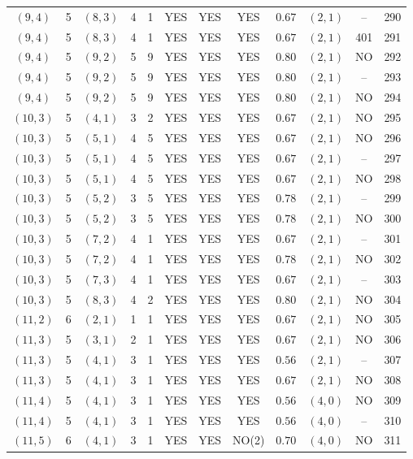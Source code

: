 \begin{longtable}{|c|c|c|c|c|c|c|c|c|c|c|c|}
$(9,4)$ & 5 & $(8,3)$ & 4 & 1 & YES & YES & YES & $0.67$ & $(2,1)$ & -- & 290\\
$(9,4)$ & 5 & $(8,3)$ & 4 & 1 & YES & YES & YES & $0.67$ & $(2,1)$ & 401 & 291\\
$(9,4)$ & 5 & $(9,2)$ & 5 & 9 & YES & YES & YES & $0.80$ & $(2,1)$ & NO & 292\\
$(9,4)$ & 5 & $(9,2)$ & 5 & 9 & YES & YES & YES & $0.80$ & $(2,1)$ & -- & 293\\
$(9,4)$ & 5 & $(9,2)$ & 5 & 9 & YES & YES & YES & $0.80$ & $(2,1)$ & NO & 294\\
$(10,3)$ & 5 & $(4,1)$ & 3 & 2 & YES & YES & YES & $0.67$ & $(2,1)$ & NO & 295\\
$(10,3)$ & 5 & $(5,1)$ & 4 & 5 & YES & YES & YES & $0.67$ & $(2,1)$ & NO & 296\\
$(10,3)$ & 5 & $(5,1)$ & 4 & 5 & YES & YES & YES & $0.67$ & $(2,1)$ & -- & 297\\
$(10,3)$ & 5 & $(5,1)$ & 4 & 5 & YES & YES & YES & $0.67$ & $(2,1)$ & NO & 298\\
$(10,3)$ & 5 & $(5,2)$ & 3 & 5 & YES & YES & YES & $0.78$ & $(2,1)$ & -- & 299\\
$(10,3)$ & 5 & $(5,2)$ & 3 & 5 & YES & YES & YES & $0.78$ & $(2,1)$ & NO & 300\\
$(10,3)$ & 5 & $(7,2)$ & 4 & 1 & YES & YES & YES & $0.67$ & $(2,1)$ & -- & 301\\
$(10,3)$ & 5 & $(7,2)$ & 4 & 1 & YES & YES & YES & $0.78$ & $(2,1)$ & NO & 302\\
$(10,3)$ & 5 & $(7,3)$ & 4 & 1 & YES & YES & YES & $0.67$ & $(2,1)$ & -- & 303\\
$(10,3)$ & 5 & $(8,3)$ & 4 & 2 & YES & YES & YES & $0.80$ & $(2,1)$ & NO & 304\\
$(11,2)$ & 6 & $(2,1)$ & 1 & 1 & YES & YES & YES & $0.67$ & $(2,1)$ & NO & 305\\
$(11,3)$ & 5 & $(3,1)$ & 2 & 1 & YES & YES & YES & $0.67$ & $(2,1)$ & NO & 306\\
$(11,3)$ & 5 & $(4,1)$ & 3 & 1 & YES & YES & YES & $0.56$ & $(2,1)$ & -- & 307\\
$(11,3)$ & 5 & $(4,1)$ & 3 & 1 & YES & YES & YES & $0.67$ & $(2,1)$ & NO & 308\\
$(11,4)$ & 5 & $(4,1)$ & 3 & 1 & YES & YES & YES & $0.56$ & $(4,0)$ & NO & 309\\
$(11,4)$ & 5 & $(4,1)$ & 3 & 1 & YES & YES & YES & $0.56$ & $(4,0)$ & -- & 310\\
$(11,5)$ & 6 & $(4,1)$ & 3 & 1 & YES & YES & NO(2) & $0.70$ & $(4,0)$ & NO & 311\\

\end{longtable}
